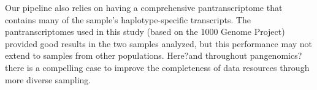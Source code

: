 \documentclass[11pt]{ucthesis}
\newcommand{\tool}[1]{\emph{\textsc{#1}}}
\begin{document}
Our pipeline also relies on having a comprehensive pantranscriptome that contains many of the sample's haplotype-specific transcripts. The pantranscriptomes used in this study (based on the 1000 Genome Project) provided good results in the two samples analyzed, but this performance may not extend to samples from other populations. Here?and throughout pangenomics?there is a compelling case to improve the completeness of data resources through more diverse sampling.

\end{document}

